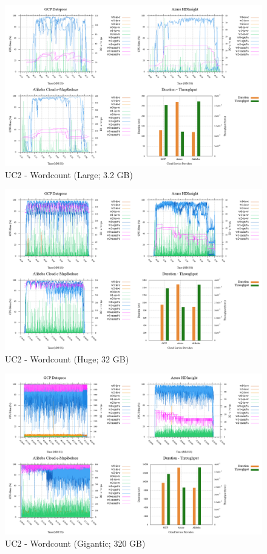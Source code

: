\documentclass[review]{elsarticle}
\begin{document}
\begin{figure}[b]
	\caption{UC2 - Wordcount (Large; 3.2 GB)}
	\label{fig:uc2-wrdcnt-l-cmidt}
	\includegraphics[width=\textwidth]{uc2-wrdcnt-l-cmidt}
	\centering
\end{figure}

\begin{figure}[b]
	\caption{UC2 - Wordcount (Huge; 32 GB)}
	\label{fig:uc2-wrdcnt-h-cmidt}
	\includegraphics[width=\textwidth]{uc2-wrdcnt-h-cmidt}
	\centering
\end{figure}

\begin{figure}[b]
	\caption{UC2 - Wordcount (Gigantic; 320 GB)}
	\label{fig:uc2-wrdcnt-g-cmidt}
	\includegraphics[width=\textwidth]{uc2-wrdcnt-g-cmidt}
	\centering
\end{figure}
\end{document}
